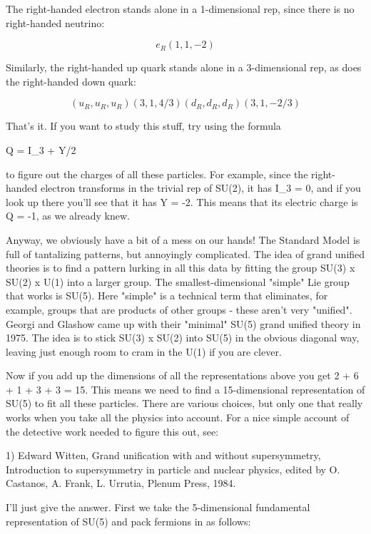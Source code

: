 The right-handed electron stands alone in a 1-dimensional rep, since
there is no right-handed neutrino:


$$

e_{R}                                         (1,1,-2)
$$
    
Similarly, the right-handed up quark stands alone in a 3-dimensional
rep, as does the right-handed down quark:


$$

(u_{R}, u_{R}, u_{R})                             (3,1,4/3) 

(d_{R}, d_{R}, d_{R})                             (3,1,-2/3)
$$
    
That's it.  If you want to study this stuff, try using the formula

Q = I_{3} + Y/2

to figure out the charges of all these particles.  For example, since
the right-handed electron transforms in the trivial rep of SU(2), it
has I_{3} = 0, and if you look up there you'll see that it has Y = -2.
This means that its electric charge is Q = -1, as we already knew.  

Anyway, we obviously have a bit of a mess on our hands!  The Standard
Model is full of tantalizing patterns, but annoyingly complicated.
The idea of grand unified theories is to find a pattern lurking in all
this data by fitting the group SU(3) x SU(2) x U(1) into a larger
group.  The smallest-dimensional "simple" Lie group that works is
SU(5).  Here "simple" is a technical term that eliminates, for
example, groups that are products of other groups - these aren't very
"unified".  Georgi and Glashow came up with their "minimal" SU(5)
grand unified theory in 1975.  The idea is to stick SU(3) x SU(2) into
SU(5) in the obvious diagonal way, leaving just enough room to cram in
the U(1) if you are clever.

Now if you add up the dimensions of all the representations above you
get 2 + 6 + 1 + 3 + 3 = 15.  This means we need to find a
15-dimensional representation of SU(5) to fit all these particles.
There are various choices, but only one that really works when you
take all the physics into account.  For a nice simple account of the
detective work needed to figure this out, see:

1) Edward Witten, Grand unification with and without supersymmetry,
Introduction to supersymmetry in particle and nuclear physics, edited by
O. Castanos, A. Frank, L. Urrutia, Plenum Press, 1984.

I'll just give the answer.  First we take the 5-dimensional fundamental
representation of SU(5) and pack fermions in as follows:


